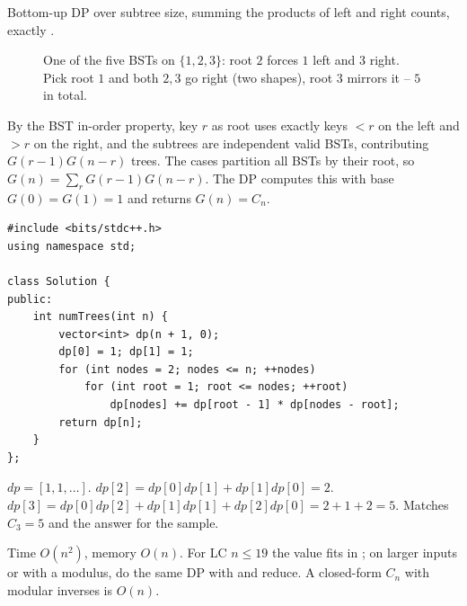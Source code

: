 Bottom-up DP over subtree size, summing the products of left and right counts, exactly
.
\begin{figure}[H]
\centering
{}
\caption{One of the five BSTs on $\{1,2,3\}$: root $2$ forces $1$ left and $3$ right.
Pick root $1$ and both $2,3$ go right (two shapes), root $3$ mirrors it -- $5$ in total.}\label{fig:c01-unique-bst}
\end{figure}

\begin{proofbox}
By the BST in-order property, key $r$ as root uses exactly keys $<r$ on the left and $>r$
on the right, and the subtrees are independent valid BSTs, contributing
$G(r-1)G(n-r)$ trees. The cases partition all BSTs by their root, so $G(n)=\sum_r
G(r-1)G(n-r)$. The DP computes this with base $G(0)=G(1)=1$ and returns $G(n)=C_n$.
\end{proofbox}

\begin{lstlisting}[caption={Unique Binary Search Trees (LeetCode 96)}, label={lst:c01-unique-bst}]
#include <bits/stdc++.h>
using namespace std;

class Solution {
public:
    int numTrees(int n) {
        vector<int> dp(n + 1, 0);
        dp[0] = 1; dp[1] = 1;
        for (int nodes = 2; nodes <= n; ++nodes)
            for (int root = 1; root <= nodes; ++root)
                dp[nodes] += dp[root - 1] * dp[nodes - root];
        return dp[n];
    }
};
\end{lstlisting}

\begin{tracebox}
$dp = [1,1,\dots]$. $dp[2] = dp[0]dp[1] + dp[1]dp[0] = 2$. $dp[3] =
dp[0]dp[2] + dp[1]dp[1] + dp[2]dp[0] = 2 + 1 + 2 = 5$. Matches $C_3 = 5$ and the answer
for the sample.
\end{tracebox}

\begin{complexitybox}
Time $O(n^2)$, memory $O(n)$. For LC $n \le 19$ the value fits in ; on larger
inputs or with a modulus, do the same DP with  and reduce. A closed-form
$C_n$ with modular inverses is $O(n)$.
\end{complexitybox}

